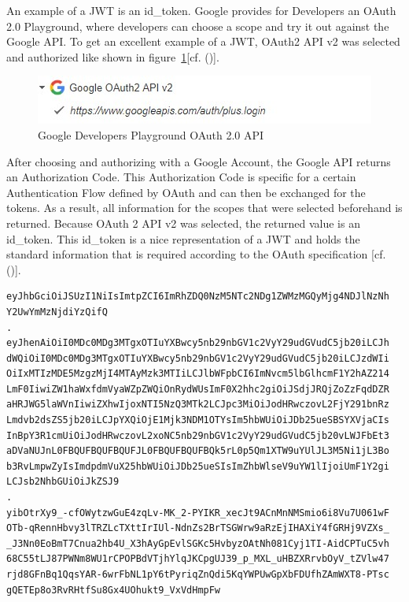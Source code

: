 An example of a JWT is an id\_token. Google provides for Developers an OAuth 2.0 Playground, where developers can choose a scope and try it out against the Google API. To get an excellent example of a JWT, OAuth2 API v2 was selected and authorized like shown in figure~\ref{fig:googleoauthplaygroundoauthapi}[cf. (\cite{Google:2018:OAuthPlayground})].


\begin{figure}[h]
	\centering
	\includegraphics[width=0.8\linewidth]{images/googleOAuthPlaygroundOAuthAPI}
	\caption[OAuth API]{Google Developers Playground OAuth 2.0 API}
	\label{fig:googleoauthplaygroundoauthapi}
\end{figure}

After choosing and authorizing with a Google Account, the Google API returns an Authorization Code. This Authorization Code is specific for a certain Authentication Flow defined by OAuth and can then be exchanged for the tokens. As a result, all information for the scopes that were selected beforehand is returned. Because OAuth 2 API v2 was selected, the returned value is an id\_token. This id\_token is a nice representation of a JWT and holds the standard information that is required according to the OAuth specification  [cf. (\cite{Google:2018:OAuthPlayground})].


\begin{lstlisting}
eyJhbGciOiJSUzI1NiIsImtpZCI6ImRhZDQ0NzM5NTc2NDg1ZWMzMGQyMjg4NDJlNzNh
Y2UwYmMzNjdiYzQifQ
.
eyJhenAiOiI0MDc0MDg3MTgxOTIuYXBwcy5nb29nbGV1c2VyY29udGVudC5jb20iLCJh
dWQiOiI0MDc0MDg3MTgxOTIuYXBwcy5nb29nbGV1c2VyY29udGVudC5jb20iLCJzdWIi
OiIxMTIzMDE5MzgzMjI4MTAyMzk3MTIiLCJlbWFpbCI6ImNvcm5lbGlhcmF1Y2hAZ214
LmF0IiwiZW1haWxfdmVyaWZpZWQiOnRydWUsImF0X2hhc2giOiJSdjJRQjZoZzFqdDZR
aHRJWG5laWVnIiwiZXhwIjoxNTI5NzQ3MTk2LCJpc3MiOiJodHRwczovL2FjY291bnRz
Lmdvb2dsZS5jb20iLCJpYXQiOjE1Mjk3NDM1OTYsIm5hbWUiOiJDb25ueSBSYXVjaCIs
InBpY3R1cmUiOiJodHRwczovL2xoNC5nb29nbGV1c2VyY29udGVudC5jb20vLWJFbEt3
aDVaNUJnL0FBQUFBQUFBQUFJL0FBQUFBQUFBQk5rL0p5Qm1XTW9uYUlJL3M5Ni1jL3Bo
b3RvLmpwZyIsImdpdmVuX25hbWUiOiJDb25ueSIsImZhbWlseV9uYW1lIjoiUmF1Y2gi
LCJsb2NhbGUiOiJkZSJ9
.
yibOtrXy9_-cfOWytzwGuE4zqLv-MK_2-PYIKR_xecJt9ACnMnNMSmio6i8Vu7U061wF
OTb-qRennHbvy3lTRZLcTXttIrIUl-NdnZs2BrTSGWrw9aRzEjIHAXiY4fGRHj9VZXs_
_J3Nn0EoBmT7Cnua2hb4U_X3hAyGpEvlSGKc5HvbyzOAtNh081Cyj1TI-AidCPTuC5vh
68C55tLJ87PWNm8WU1rCPOPBdVTjhYlqJKCpgUJ39_p_MXL_uHBZXRrvbOyV_tZVlw47
rjd8GFnBq1QqsYAR-6wrFbNL1pY6tPyriqZnQdi5KqYWPUwGpXbFDUfhZAmWXT8-PTsc
gQETEp8o3RvRHtfSu8Gx4UOhukt9_VxVdHmpFw
\end{lstlisting}


